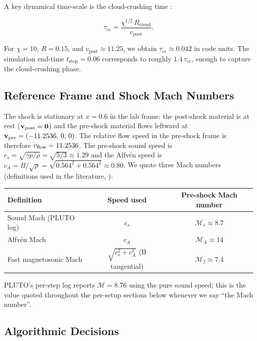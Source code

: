 \documentclass[11pt,a4paper]{article}
\begin{document}
A key dynamical time-scale is the cloud-crushing time \cite{klein1994}:

$$
\tau_{\mathrm{cc}} = \frac{\chi^{1/2}\,R_{\mathrm{cloud}}} {v_{\mathrm{post}}}.
$$

For $\chi = 10$, $R = 0.15$, and $v_{\mathrm{post}} \approx 11.25$, we obtain $\tau_{\mathrm{cc}} \approx 0.042$ in code units. The simulation end-time $t_{\mathrm{stop}} = 0.06$ corresponds to roughly $1.4\,\tau_{\mathrm{cc}}$, enough to capture the cloud-crushing phase.

\subsection{Reference Frame and Shock Mach Numbers}

The shock is stationary at $x = 0.6$ in the lab frame: the post-shock material is at rest ($\mathbf{v}_{\rm post} = \mathbf{0}$) and the pre-shock material flows leftward at $\mathbf{v}_{\rm pre} = (-11.2536,\,0,\,0)$. The relative flow speed in the pre-shock frame is therefore $v_{\rm flow} = 11.2536$. The pre-shock sound speed is $c_s = \sqrt{\gamma p/\rho} = \sqrt{5/3} \approx 1.29$ and the Alfv\'en speed is $c_A = B / \sqrt{\rho} = \sqrt{0.564^2 + 0.564^2} \approx 0.80$. We quote three Mach numbers (definitions used in the literature, \cite{brio1988}):

\medskip
\begin{center}
\small
\begin{tabular}{lcc}
\toprule Definition & Speed used & Pre-shock Mach number \\ \midrule
Sound Mach (PLUTO log) & $c_s$ & $\mathcal{M}_s \approx 8.7$ \\
Alfvén Mach            & $c_A$ & $\mathcal{M}_A \approx 14$ \\
Fast magnetosonic Mach  & $\sqrt{c_s^2 + c_A^2}$ (B tangential) & $\mathcal{M}_f \approx 7.4$ \\ \bottomrule
\end{tabular}
\end{center}
\medskip

PLUTO's per-step log reports $\mathcal{M} = 8.76$ using the pure sound speed; this is the value quoted throughout the per-setup sections below whenever we say ``the Mach number''.

\subsection{Algorithmic Decisions}
\end{document}
